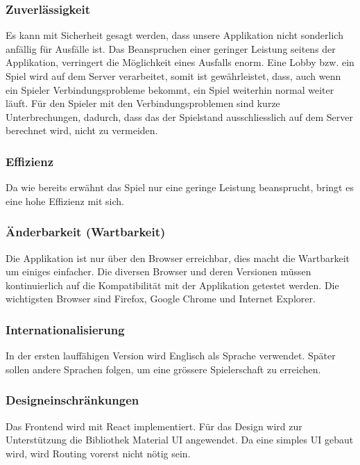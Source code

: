 \documentclass[11pt,ngerman]{article}
\begin{document}
    \subsubsection{Zuverlässigkeit}
    Es kann mit Sicherheit gesagt werden, dass unsere Applikation nicht sonderlich anfällig für Ausfälle ist. Das Beanspruchen einer geringer Leistung seitens der Applikation, verringert die Möglichkeit eines Ausfalls enorm. Eine Lobby bzw. ein Spiel wird auf dem Server verarbeitet, somit ist gewährleistet, dass, auch wenn ein Spieler Verbindungsprobleme bekommt, ein Spiel weiterhin normal weiter läuft. Für den Spieler mit den Verbindungsproblemen sind kurze Unterbrechungen, dadurch, dass das der Spielstand ausschliesslich auf dem Server berechnet wird, nicht zu vermeiden.
    \subsubsection{Effizienz}
    Da wie bereits erwähnt das Spiel nur eine geringe Leistung beansprucht, bringt es eine hohe Effizienz mit sich.
    \subsubsection{Änderbarkeit (Wartbarkeit)}
    Die Applikation ist nur über den Browser erreichbar, dies macht die Wartbarkeit um einiges einfacher. Die diversen Browser und deren Versionen müssen kontinuierlich auf die Kompatibilität mit der Applikation getestet werden. Die wichtigsten Browser sind Firefox, Google Chrome und Internet Explorer.
    \subsubsection{Internationalisierung}
    In der ersten lauffähigen Version wird Englisch als Sprache verwendet. Später sollen andere Sprachen folgen, um eine grössere Spielerschaft zu erreichen.
    \subsubsection{Designeinschränkungen}
    Das Frontend wird mit \Gls{React} implementiert. Für das Design wird zur Unterstützung die Bibliothek Material UI angewendet. Da eine simples UI gebaut wird, wird Routing vorerst nicht nötig sein.
\end{document}
